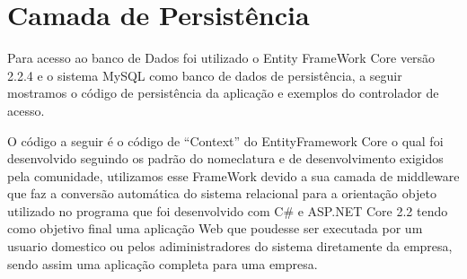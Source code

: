 \documentclass[a4paper,10pt]{article}
\begin{document}
\section{Camada de Persistência}

Para acesso ao banco de Dados foi utilizado o Entity FrameWork Core versão 2.2.4 e o sistema MySQL como banco de dados de persistência, a seguir mostramos o código de persistência da aplicação e exemplos do controlador de acesso. 

O código a seguir é o código de ``Context'' do EntityFramework Core o qual foi desenvolvido seguindo os padrão do nomeclatura e de desenvolvimento exigidos pela comunidade, utilizamos esse FrameWork devido a sua camada de middleware que faz a conversão automática do sistema relacional para a orientação objeto utilizado no programa que foi desenvolvido com C\# e ASP.NET Core 2.2 tendo como objetivo final uma aplicação Web que poudesse ser executada por um usuario domestico ou pelos adiministradores do sistema diretamente da empresa, sendo assim uma aplicação completa para uma empresa. 

\lstset{style=cstyle} 
\end{document}
